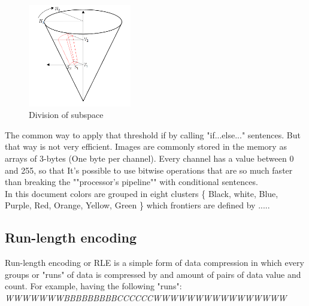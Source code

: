 \begin{figure}
	\vspace{-2.5cm}
	\includegraphics[width=0.4\textwidth,natwidth=659,natheight=659]{../Images/c2/DividingSubSpace.png}
	\caption{Division of subspace}
	\label{fig:DividingSubSpace}
\end{figure}

The common way to apply that threshold if by calling "if...else..." sentences. But that way is not very efficient. Images are commonly stored in the memory as arrays of 3-bytes (One byte per channel). Every channel has a value between 0 and 255, so that It's possible to use bitwise operations \cite{JamesBruce} that are so much faster than breaking the ""processor's pipeline"" with conditional sentences. \\


In this document colors are grouped in eight clusters \{ Black, white, Blue, Purple, Red, Orange, Yellow, Green \} which frontiers are defined by ..... %


\subsection{Run-length encoding}
Run-length encoding or RLE is a simple form of data compression in which every groups or "runs" of data is compressed by and amount of pairs of data value and count. For example, having the following "runs": \\

\textit{WWWWWWWBBBBBBBBBCCCCCCWWWWWWWWWWWWWWWW} \\


